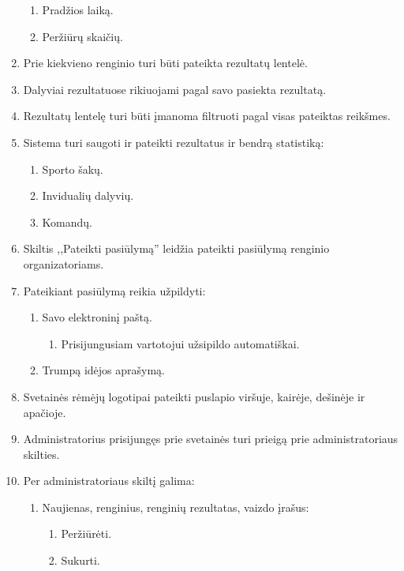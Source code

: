 \documentclass{VUMIFPSkursinis}
\begin{document}
\begin{enumerate}[label=\textbf{FR\arabic*}]
\begin{enumerate}[label*=\textbf{.\arabic*}]
						\item Pradžios laiką.
						\item Peržiūrų skaičių.
					\end{enumerate}
				\item Prie kiekvieno renginio turi būti pateikta rezultatų lentelė.
				\item Dalyviai rezultatuose rikiuojami pagal savo pasiekta rezultatą.
				\item Rezultatų lentelę turi būti įmanoma filtruoti pagal visas pateiktas reikšmes.
                \item Sistema turi saugoti ir pateikti rezultatus ir bendrą statistiką:
					\begin{enumerate}[label*=\textbf{.\arabic*}]
						\item Sporto šakų.
						\item Invidualių dalyvių.
						\item Komandų.
					\end{enumerate}
				\item Skiltis ,,Pateikti pasiūlymą'' leidžia pateikti pasiūlymą renginio organizatoriams.
				\item Pateikiant pasiūlymą reikia užpildyti:
					\begin{enumerate}[label*=\textbf{.\arabic*}]
						\item Savo elektroninį paštą.
						    \begin{enumerate}[label*=\textbf{.\arabic*}]
						        \item Prisijungusiam vartotojui užsipildo automatiškai.
						    \end{enumerate}
						\item Trumpą idėjos aprašymą.
					\end{enumerate}
				\item Svetainės rėmėjų logotipai pateikti puslapio viršuje, kairėje, dešinėje ir apačioje.
				\item Administratorius prisijungęs prie svetainės turi prieigą prie administratoriaus skilties.
				\item Per administratoriaus skiltį galima:
					\begin{enumerate}[label*=\textbf{.\arabic*}]
						\item Naujienas, renginius, renginių rezultatas, vaizdo įrašus:
						    \begin{enumerate}[label*=\textbf{.\arabic*}]
						        \item Peržiūrėti.
						        \item Sukurti.

\end{enumerate}
\end{enumerate}
\end{enumerate}
\end{document}
